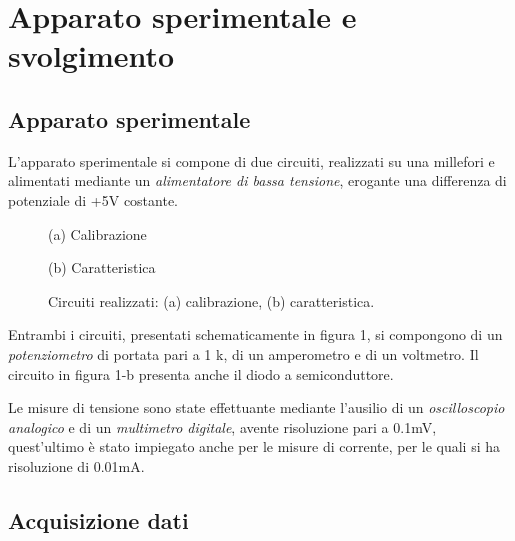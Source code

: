 \documentclass[@MAIN@]{subfiles}
\begin{document}
    \section{Apparato sperimentale e svolgimento} \label{sec:acquisizione}

    \subsection{Apparato sperimentale}\label{subsec:apparato-sperimentale}
    L'apparato sperimentale si compone di due circuiti, realizzati su una millefori
    e alimentati mediante un \textit{alimentatore di bassa tensione},
    erogante una differenza di potenziale di +5V costante.

    \begin{figure}[ht]
        \centering
        \begin{minipage}[b]{0.4\textwidth}
            \centering
            
            \caption*{(a) Calibrazione}
        \end{minipage}
        \hfill
        \begin{minipage}[b]{0.55\textwidth}
            \centering
            
            \caption*{(b) Caratteristica}
        \end{minipage}
        \caption{Circuiti realizzati: (a) calibrazione, (b) caratteristica.}
        \label{fig:figura_circuiti}
    \end{figure}

    \newpage
    Entrambi i circuiti, presentati schematicamente in figura 1, si compongono di
    un \textit{potenziometro} di portata pari a 1 k\textohm, di un amperometro e
    di un voltmetro.
    Il circuito in figura 1-b presenta anche il diodo a semiconduttore.

    Le misure di tensione sono state effettuante mediante l'ausilio di un
    \textit{oscilloscopio analogico} e di un \textit{multimetro digitale}, avente
    risoluzione pari a 0.1mV, quest'ultimo è stato impiegato anche per le misure
    di corrente, per le quali si ha risoluzione di 0.01mA.

    \subsection{Acquisizione dati}\label{subsec:acquisizione-dati}
\end{document}

